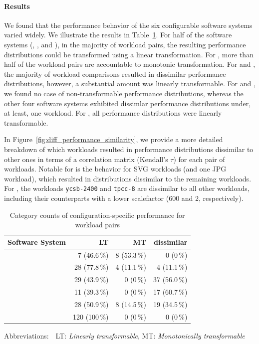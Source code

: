 \paragraph*{Results}
We found that the performance behavior of the six configurable software systems varied widely. We illustrate the results in Table~\ref{tab:categorization}. For half of the software systems (\kanzi, \batik, and \jadx), in the majority of workload pairs, the resulting performance distributions could be transformed using a linear transformation. For \jumper, more than half of the workload pairs are accountable to monotonic transformation. For \dconvert and \htwo, the majority of workload comparisons resulted in dissimilar performance distributions, however, a substantial amount was linearly transformable. For \jumper and \jadx, we found no case of non-transformable performance distributions, whereas the other four software systems exhibited dissimlar performance distributions under, at least, one workload. For \jadx, all performance distributions were linearly transformable.

In Figure~\ref{fig:diff_performance_similarity}, we provide a more detailed breakdown of which workloads resulted in performance distributions dissimilar to other ones in terms of a correlation matrix (Kendall's $\tau$) for each pair of workloads. Notable for \dconvert is the behavior for SVG workloads (and one JPG workload), which resulted in distributions dissimilar to the remaining workloads. For \htwo, the workloads \texttt{ycsb-2400} and \texttt{tpcc-8} are dissimilar to all other workloads, including their counterparts with a lower scalefactor (600 and 2, respectively).

\begin{table}
	\caption{Category counts of configuration-specific performance for workload pairs}
	\begin{tabular}{p{2.4cm}rrr}
		\toprule
		\textbf{Software System} & \textbf{LT} & \textbf{MT} & \textbf{dissimilar}\\
		\midrule
		\jumper &  7 (46.6\,\%) & \cellcolor{nicegreen!20}8 (53.3\,\%)& 0 (0\,\%)\\
		\kanzi &  \cellcolor{nicegreen!20}28 (77.8\,\%)& 4 (11.1\,\%) & 4 (11.1\,\%)\\
		\dconvert &  29 (43.9\,\%) & 0 (0\,\%) & \cellcolor{nicegreen!20}37 (56.0\,\%)\\
		\htwo &  11 (39.3\,\%) & 0 (0\,\%) & \cellcolor{nicegreen!20}17 (60.7\,\%)\\
		\batik &  \cellcolor{nicegreen!20}28 (50.9\,\%) & 8 (14.5\,\%) & 19 (34.5\,\%)\\
		\jadx  &  \cellcolor{nicegreen!20}120 (100\,\%) & 0 (0\,\%) & 0 (0\,\%)\\
		\bottomrule
	\end{tabular}
	\label{tab:categorization}
	
	{\vspace{2mm}
		{\footnotesize Abbreviations:$\quad$LT: \textit{Linearly transformable}, MT: \textit{Monotonically transformable}}
	\vspace{0.1cm}}
	
\end{table}


